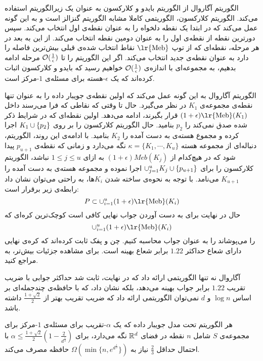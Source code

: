 الگوریتم آگاروال از الگوریتم بایدو و کلارکسون  به عنوان یک زیرالگوریتم استفاده می‌کند.
الگوریتم کلارکسون، الگوریتمی کاملا مشابه الگوریتم گنزالز است و به این گونه عمل می‌کند که در ابتدا یک نقطه دلخواه را به عنوان نقطه‌ی اول انتخاب می‌کند.
سپس دورترین نقطه از‌ نقطه‌ی اول را به عنوان دومین نقطه انتخاب می‌کند.
از این به بعد در هر مرحله، نقطه‌ای که از توپ $\text{\lr{Meb}}$ نقاط انتخاب شده‌ی قبلی بیش‌ترین فاصله را دارد به عنوان نقطه‌ی جدید انتخاب می‌کند.
اگر این الگوریتم را تا $\mathcal{O}(\frac{1}{\epsilon})$ مرحله ادامه بدهیم، به مجموعه‌ای با اندازه‌ی $\mathcal{O}(\frac{1}{\epsilon})$ خواهیم رسید که بایدو و کلارکسون اثبات کرده‌اند که یک $\epsilon$-هسته برای مسئله‌ی $1$-مرکز‌ است.

الگوریتم آگاروال به این گونه عمل می‌کند که اولین نقطه‌ی جویبار داده را به عنوان تنها نقطه‌ی مجموعه‌ی $K_1$ در نظر می‌گیرد.
حال تا وقتی که نقاطی که فرا می‌رسند داخل $(1 + \epsilon)\text{\lr{Meb}}(K_1)$ قرار بگیرند، ادامه می‌دهد.
اولین نقطه‌ای که در شرایط ذکر شده صدق نمی‌کند را $p_2$ بنامید.
حال الگوریتم کلارکسون را بر روی $K_1 \cup \left\{ p_2 \right\}$ اجرا کرده و مجموع هسته‌ی به دست آمده را $K_2$ بنامید.
با ادامه‌ی این روند، الگوریتم، دنباله‌ای از مجموعه هسته $\kappa = \{ K_1, \cdots, K_u \}$ نگه می‌دارد و زمانی که نقطه‌ی $p_{u+1}$ پیدا شود که در هیچ‌کدام از $(1 + \epsilon)Meb(K_j)$ به ازای $1 \leq j \leq u$ نباشد، الگوریتم کلارکسون را برای $\cup_{j = 1}^{u} K_j \cup \left\{ p_{u+1} \right\}$ اجرا نموده و مجموعه هسته‌ی به دست آمده را $K_{u+1}$ می‌نامد.
با توجه به نحوه‌ی ساخته شدن $K_i$ها، به راحتی می‌توان نشان داد رابطه‌ی زیر برقرار است:
$$P \subset \cup_{i=1}^u (1+\epsilon)\text{\lr{Meb}}(K_i)$$
حال در نهایت برای به دست آوردن جواب نهایی کافی است کوچک‌ترین کره‌ای که 
$$\cup_{i=1}^u (1+\epsilon)\text{\lr{Meb}}(K_i)$$
 را می‌پوشاند را به عنوان جواب محاسبه کنیم.
 چن و پفک ثابت کرده‌اند که کره‌ی نهایی دارای شعاع حداکثر $1.22$ برابر شعاع بهینه است. برای مشاهده‌ جزئیات بیش‌تر، به  مراجع کنید.

آگاروال نه تنها الگوریتمی ارائه داد که در نهایت، ثابت شد حداکثر جوابی با ضریب تقریب $1.22$ برابر جواب بهینه می‌دهد، بلکه نشان داد، که با حافظه‌ی چندجمله‌ای بر اساس $\log{n}$ و $d$ نمی‌توان الگوریتمی ارائه داد که ضریب تقریب بهتر از $\frac{1 + \sqrt{2}}{2}$ داشته باشد.

 هر الگوریتم تحت مدل جویبار داده که یک $\alpha$-تقریب برای مسئله‌‌ی $1$-مرکز برای مجموعه‌ی $S$ شامل $n$ نقطه در فضای $\mathbb{R}^d$ نگه‌ می‌دارد، برای
$\alpha \leq \frac{1 + \sqrt{2}}{2} (1 - \frac{2}{d^{\frac{1}{3}}})$
 با احتمال حداقل $\frac{2}{3}$ نیاز به 
$\Omega(\min \{n, e^{d^{\frac{1}{3}}} \})$
حافظه مصرف می‌کند.


